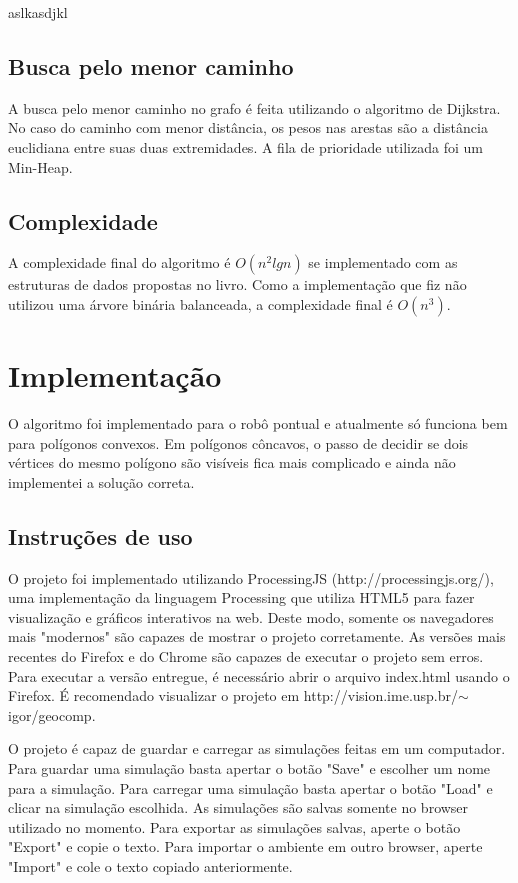 \documentclass[11pt]{article} %
\begin{document}
aslkasdjkl

\subsection{Busca pelo menor caminho}

A busca pelo menor caminho no grafo é feita utilizando o algoritmo de Dijkstra. No caso do caminho com menor distância, os pesos nas arestas são a distância euclidiana entre suas duas extremidades. A fila de prioridade utilizada foi um Min-Heap.

\subsection{Complexidade}

A complexidade final do algoritmo é $O(n^2 lg n)$ se implementado com as estruturas de dados propostas no livro. Como a implementação que fiz não utilizou uma árvore binária balanceada, a complexidade final é $O(n^3)$.

\section{Implementação}

O algoritmo foi implementado para o robô pontual e atualmente só funciona bem para polígonos convexos. Em polígonos côncavos, o passo de decidir se dois vértices do mesmo polígono são visíveis fica mais complicado e ainda não implementei a solução correta.

\subsection{Instruções de uso}

O projeto foi implementado utilizando ProcessingJS (http://processingjs.org/), uma implementação da linguagem Processing que utiliza HTML5 para fazer visualização e gráficos interativos na web. Deste modo, somente os navegadores mais "modernos" são capazes de mostrar o projeto corretamente. As versões mais recentes do Firefox e do Chrome são capazes de executar o projeto sem erros. Para executar a versão entregue, é necessário abrir o arquivo index.html usando o Firefox. É recomendado visualizar o projeto em http://vision.ime.usp.br/$\sim$igor/geocomp. 

O projeto é capaz de guardar e carregar as simulações feitas em um computador. Para guardar uma simulação basta apertar o botão "Save" e escolher um nome para a simulação. Para carregar uma simulação basta apertar o botão "Load" e clicar na simulação escolhida. As simulações são salvas somente no browser utilizado no momento. Para exportar as simulações salvas, aperte o botão "Export" e copie o texto. Para importar o ambiente em outro browser, aperte "Import" e cole o texto copiado anteriormente.
\end{document}
